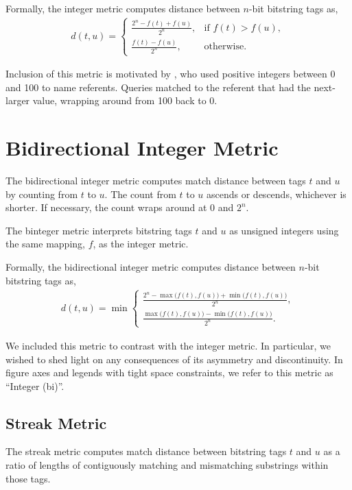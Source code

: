 Formally, the integer metric computes distance between $n$-bit bitstring tags as,
\begin{align*}
d(t, u) =
\begin{cases}
  \frac{2^n - f(t) + f(u)}{2^n}, & \text{if } f(t) > f(u), \\
  \frac{f(t) - f(u)}{2^n},         & \text{otherwise}.
\end{cases}
\end{align*}

Inclusion of this metric is motivated by \cite{spector2011tag}, who used positive integers between 0 and 100 to name referents.
Queries matched to the referent that had the next-larger value, wrapping around from 100 back to 0.

\section{Bidirectional Integer Metric} \label{sec:bidirectionalinteger}

The bidirectional integer metric computes match distance between tags $t$ and $u$ by counting from $t$ to $u$.
The count from $t$ to $u$ ascends or descends, whichever is shorter.
If necessary, the count wraps around at $0$ and $2^n$.

The binteger metric interprets bitstring tags $t$ and $u$ as unsigned integers using the same mapping, $f$, as the integer metric.

Formally, the bidirectional integer metric computes distance between $n$-bit bitstring tags as,
\begin{align*}
d(t, u) =
\min
\begin{cases}
  \frac{2^n - \max\big(f(t), f(u)\big) + \min\big(f(t), f(u)\big)}{2^n}, \\
  \frac{\max\big(f(t), f(u)\big) - \min\big(f(t), f(u)\big)}{2^n}.
\end{cases}
\end{align*}

We included this metric to contrast with the integer metric. In particular, we wished to shed light on any consequences of its asymmetry and discontinuity.
In figure axes and legends with tight space constraints, we refer to this metric as ``Integer (bi)''.

\subsection{Streak Metric} \label{sec:streak}

The streak metric computes match distance between bitstring tags $t$ and $u$ as a ratio of lengths of contiguously matching and mismatching substrings within those tags.

